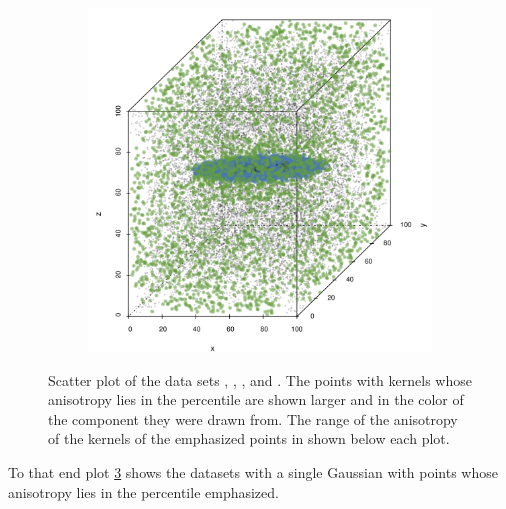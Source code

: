 \begin{figure}
\begin{subfigure}{0.23\textwidth}
					\caption{}
					\label{fig:discussion:anisotropy:baakman4}
				\end{subfigure}		
				\begin{subfigure}{0.23\textwidth}
					\centering
					\includegraphics[keepaspectratio=true, width=\textwidth, height=0.23\textheight]{discussion/img/baakman_5_60000_anisotropy.png}
					\caption{}
					\label{fig:discussion:anisotropy:baakman5}
				\end{subfigure}			
				\caption{Scatter plot of the data sets
					 \ferdosiOne, %
					 \baakmanOne, %
					 \baakmanFour, and %
					 \baakmanFive. %
					The points with kernels whose anisotropy lies in the  percentile are shown larger and in the color of the component they were drawn from. The range of the anisotropy of the kernels of the emphasized points in shown below each plot.}
				\label{fig:discussion:anisotropy:singleSphere}
			\end{figure}
			To that end plot \cref{fig:discussion:anisotropy:singleSphere} shows the datasets with a single Gaussian with points whose anisotropy lies in the  percentile emphasized. 
